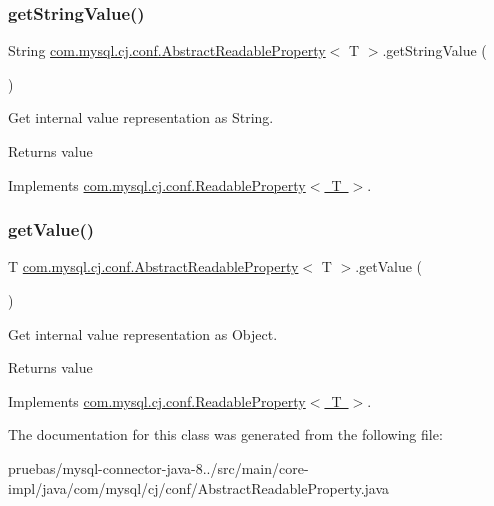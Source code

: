 \subsubsection{\texorpdfstring{get\+String\+Value()}{getStringValue()}}
{\footnotesize\ttfamily String \mbox{\hyperlink{classcom_1_1mysql_1_1cj_1_1conf_1_1_abstract_readable_property}{com.\+mysql.\+cj.\+conf.\+Abstract\+Readable\+Property}}$<$ T $>$.get\+String\+Value (\begin{DoxyParamCaption}{ }\end{DoxyParamCaption})}

Get internal value representation as String.

\begin{DoxyReturn}{Returns}
value 
\end{DoxyReturn}


Implements \mbox{\hyperlink{interfacecom_1_1mysql_1_1cj_1_1conf_1_1_readable_property_a33c24e6ce00a092c5ab1929d241110ba}{com.\+mysql.\+cj.\+conf.\+Readable\+Property$<$ T $>$}}.

\mbox{\label{classcom_1_1mysql_1_1cj_1_1conf_1_1_abstract_readable_property_abb381de77253efc91da51b518f28ed42}} 
\subsubsection{\texorpdfstring{get\+Value()}{getValue()}}
{\footnotesize\ttfamily T \mbox{\hyperlink{classcom_1_1mysql_1_1cj_1_1conf_1_1_abstract_readable_property}{com.\+mysql.\+cj.\+conf.\+Abstract\+Readable\+Property}}$<$ T $>$.get\+Value (\begin{DoxyParamCaption}{ }\end{DoxyParamCaption})}

Get internal value representation as Object.

\begin{DoxyReturn}{Returns}
value 
\end{DoxyReturn}


Implements \mbox{\hyperlink{interfacecom_1_1mysql_1_1cj_1_1conf_1_1_readable_property_a602dfa3dbe87560a5ceca17a38f30844}{com.\+mysql.\+cj.\+conf.\+Readable\+Property$<$ T $>$}}.



The documentation for this class was generated from the following file\+:\begin{DoxyCompactItemize}
\item 
pruebas/mysql-\/connector-\/java-\/8../src/main/core-\/impl/java/com/mysql/cj/conf/Abstract\+Readable\+Property.\+java\end{DoxyCompactItemize}
